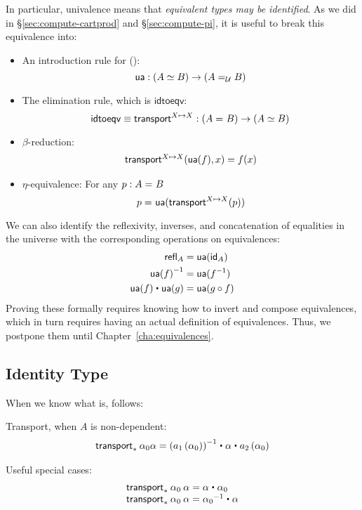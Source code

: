 In particular, univalence means that \emph{equivalent types may be identified}.
As we did in \S\ref{sec:compute-cartprod} and \S\ref{sec:compute-pi}, it is useful to break this equivalence into:

\begin{itemize}
\item An introduction rule for {()}:
  \[
  \ua : ({\eqv A B}) \to (\id[\type]{A}{B})
  \]
\item The elimination rule, which is $\mathsf{idtoeqv}$:
  \[
  \mathsf{idtoeqv} \jdeq \transfibf{X \mapsto X} : (\id{A}{B}) \to (\eqv A B)
  \]
\item $\beta$-reduction: 
  \[
  \begin{array}{l}
  \transfib{X \mapsto X}{\ua(f)}{x} = f(x)
  \end{array}
  \]
\item $\eta$-equivalence: For any $p : \id A B$
  \[
  \id{p}{\ua(\transfibf{X \mapsto X}(p))}
  \]
\end{itemize}

We can also identify the reflexivity, inverses, and concatenation of equalities in the universe with the corresponding operations on equivalences:
\begin{align*}
  \refl{A} &= \ua(\idfunc[A]) \\
  \opp{\ua(f)} &= \ua(f^{-1}) \\ 
  \ua(f) \ct \ua(g) &= \ua(g\circ f)
\end{align*}
Proving these formally requires knowing how to invert and compose equivalences, which in turn requires having an actual definition of equivalences.
Thus, we postpone them until Chapter~\ref{cha:equivalences}.


\subsection{Identity Type}
\label{sec:compute-paths}

When we know what \id[A]{}{} is, \id[ {\id[A]{}{}} ]{}{} follows:

Transport, when $A$ is non-dependent:
\[
\begin{array}{l}
\transport{x_0:A_0 \mapsto \id[A] {a_1(x_0)}{a_2(x_0)}} {\alpha_0}{\alpha} = 
\opp{(\map{a_1}{\alpha_0})} \ct \alpha \ct \map{a_2}{\alpha_0}
\end{array}
\]

Useful special cases:
\[
\begin{array}{l}
\transport{x:A \mapsto \id[A] {a}{x}} {\alpha_0} \: {\alpha} = \alpha \ct \alpha_0 \\
\transport{x:A \mapsto \id[A] {x_0}{a}} {\alpha_0} \: {\alpha} = \opp {\alpha_0} \ct \alpha \\
\end{array}
\]

